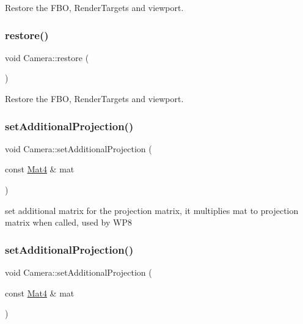 Restore the F\+BO, Render\+Targets and viewport. \mbox{\label{classCamera_a5e2265707fe1a6e67e06a2f7d2893b74}} 
\subsubsection{\texorpdfstring{restore()}{restore()}\hspace{0.1cm}{\footnotesize\ttfamily [2/2]}}
{\footnotesize\ttfamily void Camera\+::restore (\begin{DoxyParamCaption}{ }\end{DoxyParamCaption})}

Restore the F\+BO, Render\+Targets and viewport. \mbox{\label{classCamera_ab3d0364f67e78080b9bacee82678c542}} 
\subsubsection{\texorpdfstring{set\+Additional\+Projection()}{setAdditionalProjection()}\hspace{0.1cm}{\footnotesize\ttfamily [1/2]}}
{\footnotesize\ttfamily void Camera\+::set\+Additional\+Projection (\begin{DoxyParamCaption}\item[{const \hyperlink{classMat4}{Mat4} \&}]{mat }\end{DoxyParamCaption})}

set additional matrix for the projection matrix, it multiplies mat to projection matrix when called, used by W\+P8 \mbox{\label{classCamera_ab3d0364f67e78080b9bacee82678c542}} 
\subsubsection{\texorpdfstring{set\+Additional\+Projection()}{setAdditionalProjection()}\hspace{0.1cm}{\footnotesize\ttfamily [2/2]}}
{\footnotesize\ttfamily void Camera\+::set\+Additional\+Projection (\begin{DoxyParamCaption}\item[{const \hyperlink{classMat4}{Mat4} \&}]{mat }\end{DoxyParamCaption})}


